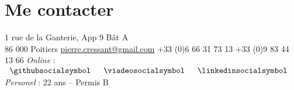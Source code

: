 \section{Me contacter}
\hspace*{1.27cm}\address 31 rue de la Ganterie, App 9 Bât A\\\hspace*{1.75cm}86 000 Poitiers \newline
\hspace*{1.27cm}\emailsymbol \href{mailto:pierre.cressant@gmail.com}{pierre.cressant@gmail.com} \newline
\hspace*{1.27cm}\mobilesymbol +33 (0)6 66 31 73 13	\newline
\hspace*{1.27cm}\phonesymbol +33 (0)9 83 44 13 66 \newline
\hspace*{1.08cm} \textit{\small{Online}} : $
\begin{array}{ccc}
\githubsocialsymbol & \hspace*{0.2cm} \viadeosocialsymbol & \hspace*{0.2cm} \linkedinsocialsymbol
\end{array} $\\
\hspace*{1.08cm} \small{\textit{Personel} : 22 ans -- Permis B}

\vspace*{-1mm}